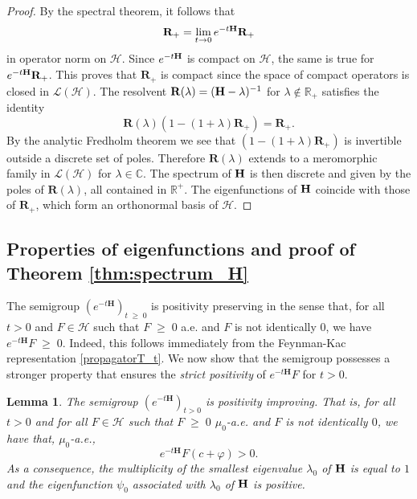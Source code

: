 \documentclass[11pt]{amsart}
\numberwithin{equation}{section}
\newtheorem{lemma}[theorem]{Lemma}
\theoremstyle{definition}
\renewcommand{\geq}{\;\geqslant\;}                   %
\newcommand{\C}{\mathbb{C}}
\renewcommand{\H}{\mathbb{H}}
\newcommand{\R}{\mathbb{R}}
\def\H{\mathbf{H}}
\def\bR{\mathbf{R}}
\newcommand{\mc}{\mathcal}
\begin{document}
\begin{proof}
By the spectral theorem, it follows that 
\[ \bR_+=\lim_{t\to 0}e^{-t{\bf H}}\bR_+\]
in operator norm on $\mc{H}$. Since $e^{-t{\bf H}}$ is compact on $\mc{H}$, the same is true for $e^{-t{\bf H}}\bR_+$. 
This proves that $\bR_+$ is compact since the space of compact operators is closed in $\mc{L}(\mc{H})$. The resolvent 
$\bR(\lambda)=({\bf H}-\lambda)^{-1}$ for $\lambda \notin \R_+$ 
satisfies the identity
\[ \bR(\lambda)(1-(1+\lambda)\bR_+)=\bR_+.\]
By the analytic Fredholm theorem we see that $(1-(1+\lambda)\bR_+)$ is invertible outside a discrete set of poles. Therefore 
$\bR(\lambda)$ extends to a meromorphic family in $\mc{L}(\mc{H})$ for $\lambda\in \C$. 
The spectrum of ${\bf H}$ is then discrete and given by the poles of $\bR(\lambda)$, all contained in $\R^+$. 
The eigenfunctions of ${\bf H}$ coincide with those of $\bR_+$, which form an orthonormal basis of $\mc{H}$.
\end{proof}

\subsection{Properties of eigenfunctions and proof of Theorem \ref{thm:spectrum_H}}

The semigroup $(e^{-t\H})_{t \geq 0}$ is positivity preserving in the sense that, for all $t > 0$ and $F\in\mc{H}$ such that $F\geq 0$ a.e. 
and $F$ is not identically $0$, we have $e^{-t\H}F\geq 0$. Indeed, this follows immediately from the Feynman-Kac representation \eqref{propagatorT_t}. We now show that the semigroup possesses a stronger property that ensures the \textit{strict positivity} of $e^{-t\H}F$ for $t>0$.

\begin{lemma} \label{lem: positivity improving}
The semigroup $(e^{-t\H})_{t>0}$ is positivity improving. That is, for all $t > 0$ and for all $F \in \mc{H}$ such that $F \geq 0$ $\mu_0$-a.e. and $F$ is not identically $0$, we have that, $\mu_0$-a.e., 
\begin{equation}
e^{-t\H}F (c+\varphi)>0.	
\end{equation}	
As a consequence, the multiplicity of the smallest eigenvalue $\lambda_0$ of ${\bf H}$ is equal to $1$ and the 
eigenfunction $\psi_0$ associated with $\lambda_0$ of ${\bf H}$ is positive.
\end{lemma}
\end{document}
